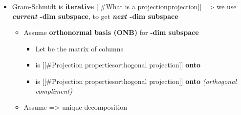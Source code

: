 \begin{itemize}

  \item
        Gram-Schmidt is \textbf{iterative} {[}{[}\#What is a
        projection\textbar projection{]}{]} => we use
        \textbf{\emph{current} -dim subspace}, to get
        \textbf{\emph{next} -dim subspace}

        \begin{itemize}

          \item
                Assume \textbf{orthonormal basis (ONB)}
                for \textbf{-dim subspace
                  }

                \begin{itemize}

                  \item
                        Let
                        be the matrix of columns
                  \item
                         is {[}{[}\#Projection
                        properties\textbar orthogonal projection{]}{]} \textbf{onto
                          }
                  \item
                        is {[}{[}\#Projection properties\textbar orthogonal
                        projection{]}{]} \textbf{onto
                          } \emph{(orthogonal
                          compliment)}
                \end{itemize}
          \item
                Assume  => unique
                decomposition

                \begin{itemize}


\end{itemize}
\end{itemize}
\end{itemize}
